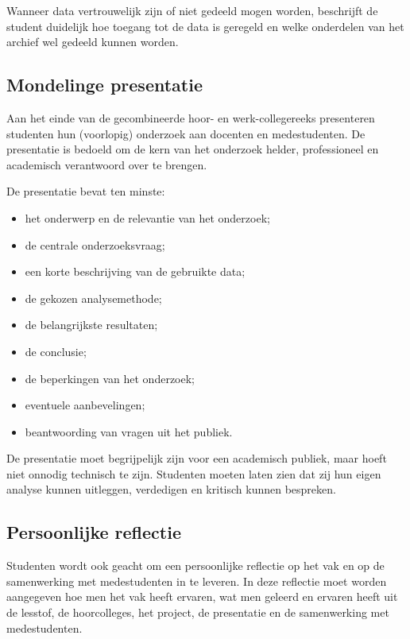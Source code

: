 \documentclass[
  letterpaper,
  DIV=11,
  numbers=noendperiod]{scrreprt}
\providecommand{\tightlist}{%
  \setlength{\itemsep}{0pt}\setlength{\parskip}{0pt}}
\begin{document}
Wanneer data vertrouwelijk zijn of niet gedeeld mogen worden, beschrijft
de student duidelijk hoe toegang tot de data is geregeld en welke
onderdelen van het archief wel gedeeld kunnen worden.

\subsection*{Mondelinge presentatie}\label{sec-pres}

Aan het einde van de gecombineerde hoor- en werk-collegereeks
presenteren studenten hun (voorlopig) onderzoek aan docenten en
medestudenten. De presentatie is bedoeld om de kern van het onderzoek
helder, professioneel en academisch verantwoord over te brengen.

De presentatie bevat ten minste:

\begin{itemize}
\tightlist
\item
  het onderwerp en de relevantie van het onderzoek;
\item
  de centrale onderzoeksvraag;
\item
  een korte beschrijving van de gebruikte data;
\item
  de gekozen analysemethode;
\item
  de belangrijkste resultaten;
\item
  de conclusie;
\item
  de beperkingen van het onderzoek;
\item
  eventuele aanbevelingen;
\item
  beantwoording van vragen uit het publiek.
\end{itemize}

De presentatie moet begrijpelijk zijn voor een academisch publiek, maar
hoeft niet onnodig technisch te zijn. Studenten moeten laten zien dat
zij hun eigen analyse kunnen uitleggen, verdedigen en kritisch kunnen
bespreken.

\subsection*{Persoonlijke reflectie}\label{sec-refl}

Studenten wordt ook geacht om een persoonlijke reflectie op het vak en
op de samenwerking met medestudenten in te leveren. In deze reflectie
moet worden aangegeven hoe men het vak heeft ervaren, wat men geleerd en
ervaren heeft uit de lesstof, de hoorcolleges, het project, de
presentatie en de samenwerking met medestudenten.
\end{document}
